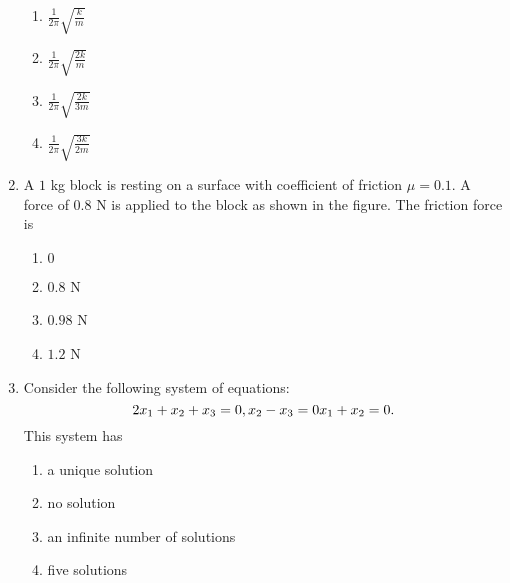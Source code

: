 \documentclass[journal,12pt,twocolumn]{IEEEtran}
\theoremstyle{remark}
\begin{document}
\begin{enumerate}[start=40]
    \begin{center}
    \end{center}

    \begin{enumerate}
        \item $\frac{1}{2\pi} \sqrt{\frac{k}{m}}$
        \item $\frac{1}{2\pi} \sqrt{\frac{2k}{m}}$
        \item $\frac{1}{2\pi} \sqrt{\frac{2k}{3m}}$
        \item $\frac{1}{2\pi} \sqrt{\frac{3k}{2m}}$
    \end{enumerate}


    \item A $1$ kg block is resting on a surface with coefficient of friction $\mu= 0.1$. A force of $0.8$ N is applied to the block as shown in the figure. The friction force is
    \begin{center}
    \end{center}
    \begin{enumerate}
        \item $0$
        \item $0.8$ N
        \item $0.98$ N
        \item $1.2$ N
    \end{enumerate}

    \item Consider the following system of equations:
    $$
    2x_1 + x_2 + x_3 = 0\\,
    x_2-x_3 = 0\\
 x_1 + x_2 = 0.
    $$
    This system has
    \begin{enumerate}
        \item a unique solution
        \item no solution
        \item an infinite number of solutions
        \item five solutions
    \end{enumerate}



\end{enumerate}
\end{document}
